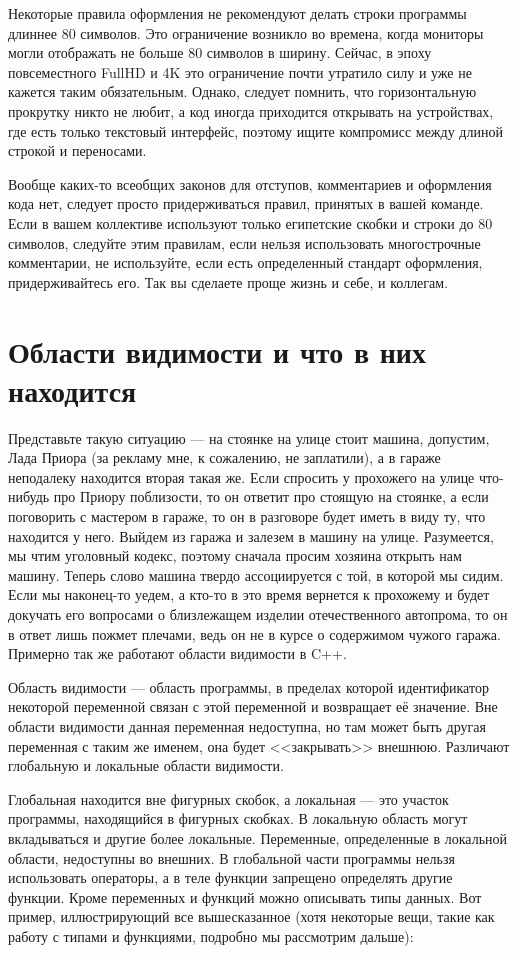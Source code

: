 \documentclass[book.tex]{subfiles}
\begin{document}
Некоторые правила оформления не рекомендуют делать строки программы длиннее 80 символов. Это ограничение возникло во времена, когда мониторы могли отображать не больше 80 символов в ширину. Сейчас, в эпоху повсеместного FullHD и 4K это ограничение почти утратило силу и уже не кажется таким обязательным. Однако, следует помнить, что горизонтальную прокрутку никто не любит, а код иногда приходится открывать на устройствах, где есть только текстовый интерфейс, поэтому ищите компромисс между длиной строкой и переносами.

Вообще каких-то всеобщих законов для отступов, комментариев и оформления кода нет, следует просто придерживаться правил, принятых в вашей команде. Если в вашем коллективе используют только египетские скобки и строки до 80 символов, следуйте этим правилам, если нельзя использовать многострочные комментарии, не используйте, если есть определенный стандарт оформления, придерживайтесь его. Так вы сделаете проще жизнь и себе, и коллегам.

\section*{Области видимости и что в них находится}

Представьте такую ситуацию --- на стоянке на улице стоит машина, допустим, Лада Приора (за рекламу мне, к сожалению, не заплатили), а в гараже неподалеку находится вторая такая же. Если спросить у прохожего на улице что-нибудь про Приору поблизости, то он ответит про стоящую на стоянке, а если поговорить с мастером в гараже, то он в разговоре будет иметь в виду ту, что находится у него. Выйдем из гаража и залезем в машину на улице. Разумеется, мы чтим уголовный кодекс, поэтому сначала просим хозяина открыть нам машину. Теперь слово машина твердо ассоциируется с той, в которой мы сидим. Если мы наконец-то уедем, а кто-то в это время вернется к прохожему и будет докучать его вопросами о близлежащем изделии отечественного автопрома, то он в ответ лишь пожмет плечами, ведь он не в курсе о содержимом чужого гаража. Примерно так же работают области видимости в C++.

Область видимости --- область программы, в пределах которой идентификатор некоторой переменной связан с этой переменной и возвращает её значение. Вне области видимости данная переменная недоступна, но там может быть другая переменная с таким же именем, она будет <<закрывать>> внешнюю. Различают глобальную и локальные области видимости. 

Глобальная находится вне фигурных скобок, а локальная --- это участок программы, находящийся в фигурных скобках. В локальную область могут вкладываться и другие более локальные. Переменные, определенные в локальной области, недоступны во внешних. В глобальной части программы нельзя использовать операторы, а в теле функции запрещено определять другие функции. Кроме переменных и функций можно описывать типы данных. Вот пример, иллюстрирующий все вышесказанное (хотя некоторые вещи, такие как работу с типами и функциями, подробно мы рассмотрим дальше):
\end{document}
